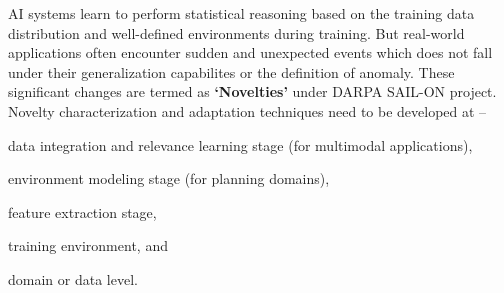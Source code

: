 





AI systems learn to perform statistical reasoning based on the training data distribution and well-defined environments during training. But real-world applications often encounter sudden and unexpected events which does not fall under their generalization capabilites or the definition of anomaly. These significant changes are termed as \textbf{`Novelties'} under DARPA SAIL-ON project. Novelty characterization and adaptation techniques need to be developed at --
\begin{enumerate*}[label=(\arabic*)]
    \item data integration and relevance learning stage (for multimodal applications), %
    \item environment modeling stage (for planning domains), 
    \item feature extraction stage,
    \item training environment, and 
    \item domain or data level.
\end{enumerate*}





